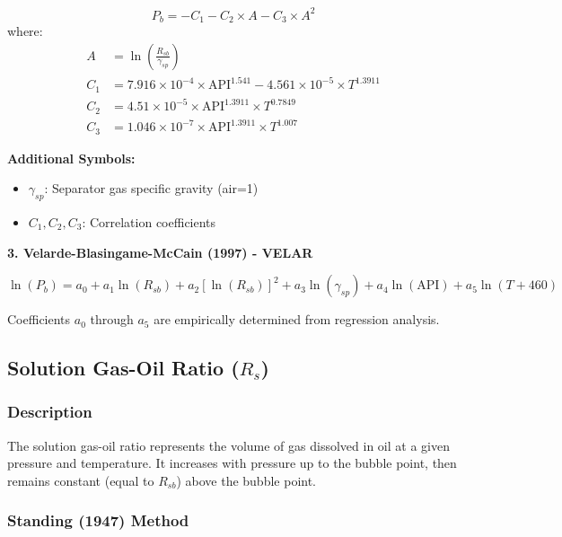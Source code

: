 \documentclass[11pt,a4paper]{article}
\newcommand{\symitem}[2]{\item \textbf{#1}: #2}
\begin{document}
\begin{tcolorbox}[colback=formulabox,colframe=black!75]
\begin{equation}
P_b = -C_1 - C_2 \times A - C_3 \times A^2
\end{equation}
where:
\begin{align}
A &= \ln \left( \frac{R_{sb}}{\gamma_{sp}} \right) \\
C_1 &= 7.916 \times 10^{-4} \times \text{API}^{1.541} - 4.561 \times 10^{-5} \times T^{1.3911} \\
C_2 &= 4.51 \times 10^{-5} \times \text{API}^{1.3911} \times T^{0.7849} \\
C_3 &= 1.046 \times 10^{-7} \times \text{API}^{1.3911} \times T^{1.007}
\end{align}
\end{tcolorbox}

\textbf{Additional Symbols:}
\begin{itemize}[leftmargin=2cm]
\symitem{$\gamma_{sp}$}{Separator gas specific gravity (air=1)}
\symitem{$C_1, C_2, C_3$}{Correlation coefficients}
\end{itemize}

\textbf{3. Velarde-Blasingame-McCain (1997) - VELAR}

\begin{tcolorbox}[colback=formulabox,colframe=black!75]
\begin{equation}
\ln(P_b) = a_0 + a_1 \ln(R_{sb}) + a_2 [\ln(R_{sb})]^2 + a_3 \ln(\gamma_{sp}) + a_4 \ln(\text{API}) + a_5 \ln(T+460)
\end{equation}
\end{tcolorbox}

Coefficients $a_0$ through $a_5$ are empirically determined from regression analysis.

\subsection{Solution Gas-Oil Ratio ($R_s$)}

\subsubsection{Description}
The solution gas-oil ratio represents the volume of gas dissolved in oil at a given pressure and temperature. It increases with pressure up to the bubble point, then remains constant (equal to $R_{sb}$) above the bubble point.

\subsubsection{Standing (1947) Method}
\end{document}
